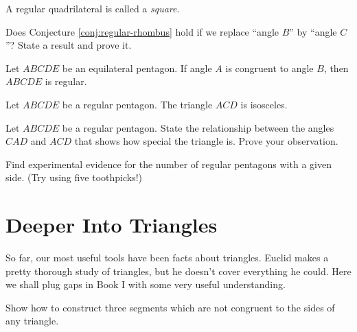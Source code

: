 \begin{definition}[reminder]\label{defn:square}
A regular quadrilateral is called a \emph{square}.
\end{definition}


\begin{problem}\label{prob:equilateral-quad}
Does Conjecture \ref{conj:regular-rhombus} hold if we replace ``angle $B$'' by ``angle $C$''? State a result and prove it.
\end{problem}

\begin{conjecture}\label{conj:equilateral-pentagon}
Let $ABCDE$ be an equilateral pentagon. If angle $A$ is congruent to angle $B$, then $ABCDE$ is regular.
\end{conjecture}



\begin{conjecture}\label{conj:regular-pentagon-central-triangle}
Let $ABCDE$ be a regular pentagon. The triangle $ACD$ is isosceles.
\end{conjecture}

\begin{problem}\label{prob:reg-pentagon-angles}
Let $ABCDE$ be a regular pentagon. State the relationship between the angles $CAD$ and $ACD$ that shows how special the triangle is. Prove your observation.
\end{problem}

\begin{problem}\label{prob:reg-pentagon-types}
Find experimental evidence for the number of regular pentagons with a given side. (Try using five toothpicks!)\\[.1in]
\end{problem}




\chapter{Deeper Into Triangles}

So far, our most useful tools have been facts about triangles. Euclid makes a pretty thorough study of triangles, but he doesn't cover everything he could. 
Here we shall plug  gaps in Book I with some very useful understanding.

\begin{problem}
\label{prob:triangle-inequality}
Show how to construct three segments which are not congruent to the sides of any triangle.
\end{problem}


